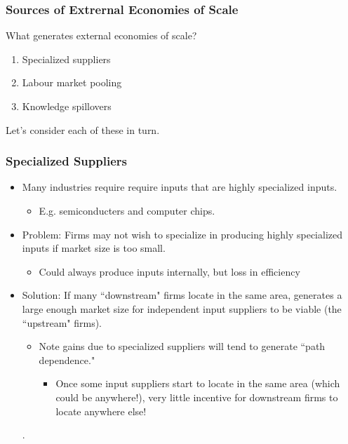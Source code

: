 \documentclass{beamer}
\begin{document}
\begin{frame}
	\frametitle{Sources of Extrernal Economies of Scale}
	
	What generates external economies of scale? \vspace{3mm}
		\begin{enumerate}
			\item Specialized suppliers
			\item Labour market pooling
			\item Knowledge spillovers
		\end{enumerate}\vspace{5mm}
	Let's consider each of these in turn.\vspace{3mm}

\end{frame}
\begin{frame}
	\frametitle{Specialized Suppliers}
\begin{itemize}
	\item Many industries require require inputs that are highly specialized inputs.
		\begin{itemize}
			\item E.g. semiconducters and computer chips.
		\end{itemize}
	\item Problem: Firms may not wish to specialize in producing highly specialized inputs if market size is too small.
		\begin{itemize}
			\item Could always produce inputs internally, but loss in efficiency
		\end{itemize}
	\item Solution: If many ``downstream" firms locate in the same area, generates a large enough market size for independent input suppliers to be viable (the ``upstream" firms).
		\begin{itemize}
			\item Note gains due to specialized suppliers will tend to generate ``path dependence."
				\begin{itemize}
					\item Once some input suppliers start to locate in the same area (which could be anywhere!), very little incentive for downstream firms to locate anywhere else!
				\end{itemize}
		\end{itemize}.
\end{itemize}
	
\end{frame}
\end{document}
